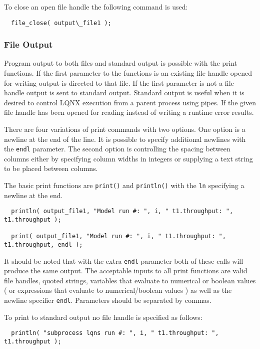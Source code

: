 To close an open file handle the following command is used:

\lstset{language=C++}
\begin{lstlisting}
  file_close( output\_file1 );
\end{lstlisting}

\subsubsection{File Output}

Program output to both files and standard output is possible with the print functions. If the first parameter to
the functions is an existing file handle opened for writing output is directed to that file. If the first parameter
is not a file handle output is sent to standard output. Standard output is useful when it is desired to control LQNX
execution from a parent process using pipes. If the given file handle has been opened for reading instead of writing
a runtime error results.

There are four variations of print commands with two options. One option is a newline at the end of the line. It is
possible to specify additional newlines with the {\tt endl} parameter. The second option is controlling the spacing
between columns either by specifying column widths in integers or supplying a text string to be placed between columns.

The basic print functions are {\tt print()} and {\tt println()} with the {\tt ln} specifying a newline at the end.

\lstset{language=C++}
\begin{lstlisting}
  println( output_file1, "Model run #: ", i, " t1.throughput: ", t1.throughput );

  print( output_file1, "Model run #: ", i, " t1.throughput: ", t1.throughput, endl );
\end{lstlisting}

It should be noted that with the extra {\tt endl} parameter both of these calls will produce the same output.
The acceptable inputs to all print functions are valid file handles, quoted strings, \ModLang variables that
evaluate to numerical or boolean values ( or expressions that evaluate to numerical/boolean values ) as well 
as the newline specifier {\tt endl}. Parameters should be separated by commas.

To print to standard output no file handle is specified as follows:

\lstset{language=C++}
\begin{lstlisting}
  println( "subprocess lqns run #: ", i, " t1.throughput: ", t1.throughput );
\end{lstlisting}

